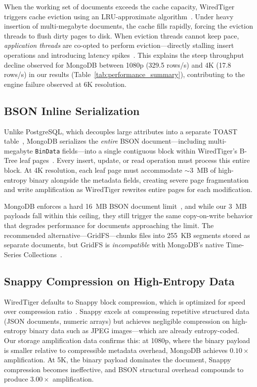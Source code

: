 \documentclass[conference, a4paper]{IEEEtran}
\begin{document}
When the working set of documents exceeds the cache capacity, WiredTiger triggers cache eviction using an LRU-approximate algorithm~\cite{percona_wiredtiger_eviction}. Under heavy insertion of multi-megabyte documents, the cache fills rapidly, forcing the eviction threads to flush dirty pages to disk. When eviction threads cannot keep pace, \emph{application threads} are co-opted to perform eviction---directly stalling insert operations and introducing latency spikes~\cite{percona_wiredtiger_eviction}. This explains the steep throughput decline observed for MongoDB between 1080p (329.5 rows/s) and 4K (17.8 rows/s) in our results (Table~\ref{tab:performance_summary}), contributing to the engine failure observed at 6K resolution.

\subsection{BSON Inline Serialization}
Unlike PostgreSQL, which decouples large attributes into a separate TOAST table~\cite{postgresql_toast_docs}, MongoDB serializes the \emph{entire} BSON document---including multi-megabyte \texttt{BinData} fields---into a single contiguous block within WiredTiger's B-Tree leaf pages~\cite{mongodb_bson_spec}. Every insert, update, or read operation must process this entire block. At 4K resolution, each leaf page must accommodate $\sim$3~MB of high-entropy binary alongside the metadata fields, creating severe page fragmentation and write amplification as WiredTiger rewrites entire pages for each modification.

MongoDB enforces a hard 16~MB BSON document limit~\cite{mongodb_bson_spec}, and while our 3~MB payloads fall within this ceiling, they still trigger the same copy-on-write behavior that degrades performance for documents approaching the limit. The recommended alternative---GridFS---chunks files into 255~KB segments stored as separate documents, but GridFS is \emph{incompatible} with MongoDB's native Time-Series Collections~\cite{mongodb_ts_limitations}.

\subsection{Snappy Compression on High-Entropy Data}
WiredTiger defaults to Snappy block compression, which is optimized for speed over compression ratio~\cite{mongodb_wiredtiger_storage}. Snappy excels at compressing repetitive structured data (JSON documents, numeric arrays) but achieves negligible compression on high-entropy binary data such as JPEG images---which are already entropy-coded. Our storage amplification data confirms this: at 1080p, where the binary payload is smaller relative to compressible metadata overhead, MongoDB achieves $0.10\times$ amplification. At 5K, the binary payload dominates the document, Snappy compression becomes ineffective, and BSON structural overhead compounds to produce $3.00\times$ amplification.
\end{document}
